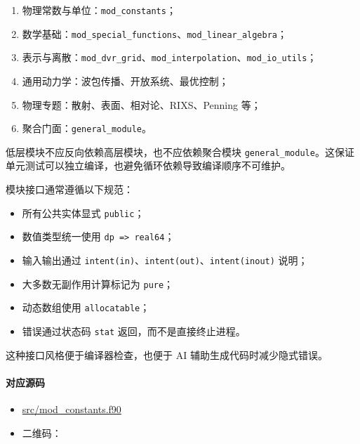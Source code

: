 \documentclass[
]{ctexbook}
\providecommand{\tightlist}{%
  \setlength{\itemsep}{0pt}\setlength{\parskip}{0pt}}
\begin{document}
\begin{enumerate}
\def\labelenumi{\arabic{enumi}.}
\tightlist
\item
  物理常数与单位：\texttt{mod\_constants}；
\item
  数学基础：\texttt{mod\_special\_functions}、\texttt{mod\_linear\_algebra}；
\item
  表示与离散：\texttt{mod\_dvr\_grid}、\texttt{mod\_interpolation}、\texttt{mod\_io\_utils}；
\item
  通用动力学：波包传播、开放系统、最优控制；
\item
  物理专题：散射、表面、相对论、RIXS、Penning 等；
\item
  聚合门面：\texttt{general\_module}。
\end{enumerate}

低层模块不应反向依赖高层模块，也不应依赖聚合模块
\texttt{general\_module}。这保证单元测试可以独立编译，也避免循环依赖导致编译顺序不可维护。

模块接口通常遵循以下规范：

\begin{itemize}
\tightlist
\item
  所有公共实体显式 \texttt{public}；
\item
  数值类型统一使用 \texttt{dp\ =\textgreater{}\ real64}；
\item
  输入输出通过
  \texttt{intent(in)}、\texttt{intent(out)}、\texttt{intent(inout)}
  说明；
\item
  大多数无副作用计算标记为 \texttt{pure}；
\item
  动态数组使用 \texttt{allocatable}；
\item
  错误通过状态码 \texttt{stat} 返回，而不是直接终止进程。
\end{itemize}

这种接口风格便于编译器检查，也便于 AI 辅助生成代码时减少隐式错误。

\hypertarget{ux5bf9ux5e94ux6e90ux7801-35}{%
\paragraph{对应源码}\label{ux5bf9ux5e94ux6e90ux7801-35}}

\begin{itemize}
\tightlist
\item
  \href{https://github.com/l1Ha/QuantumGeneralModule/blob/main/src/mod_constants.f90}{src/mod\_constants.f90}
\item
  二维码：
\end{itemize}
\end{document}
